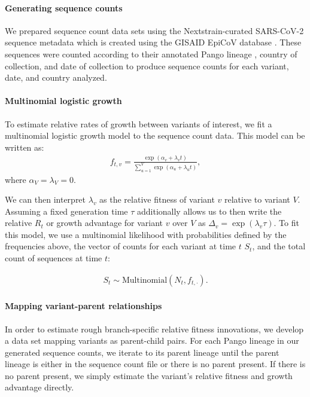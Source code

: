 \paragraph{Generating sequence counts}%

We prepared sequence count data sets using the Nextstrain-curated SARS-CoV-2 sequence metadata \cite{Hadfield2018} which is created using the GISAID EpiCoV database \cite{khare2021gisaid}.
These sequences were counted according to their annotated Pango lineage \cite{aksamentov2021nextclade}, country of collection, and date of collection to produce sequence counts for each variant, date, and country analyzed.

\paragraph{Multinomial logistic growth}

To estimate relative rates of growth between variants of interest, we fit a multinomial logistic growth model to the sequence count data.
This model can be written as:
\begin{align*}
    f_{t, v} = \frac{\exp(\alpha_{v} + \lambda_{v} t)}{\sum_{u=1}^{V} \exp(\alpha_{u} + \lambda_{u} t)},
\end{align*}
where $\alpha_{V} = \lambda_{V} = 0$.

We can then interpret $\lambda_{v}$ as the relative fitness of variant $v$ relative to variant $V$.
Assuming a fixed generation time $\tau$ additionally allows us to then write the relative $R_{t}$ or growth advantage for variant $v$ over $V$ as $\Delta_{v} = \exp(\lambda_{v}\tau)$.
To fit this model, we use a multinomial likelihood with probabilities defined by the frequencies above, the vector of counts for each variant at time $t$ $S_{t}$, and the total count of sequences at time $t$:

\begin{align*}
    S_{t} \sim \text{Multinomial}(N_{t}, f_{t, \cdot}).
\end{align*}

\paragraph{Mapping variant-parent relationships}%

In order to estimate rough branch-specific relative fitness innovations, we develop a data set mapping variants as parent-child pairs.
For each Pango lineage in our generated sequence counts, we iterate to its parent lineage until the parent lineage is either in the sequence count file or there is no parent present.
If there is no parent present, we simply estimate the variant's relative fitness and growth advantage directly.

